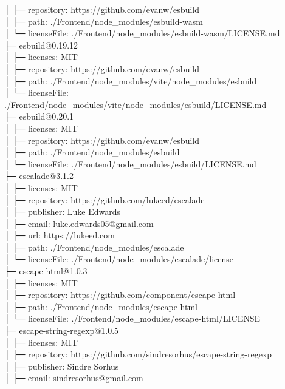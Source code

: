 │  ├─ repository: https://github.com/evanw/esbuild\\
│  ├─ path: ./Frontend/node\_modules/esbuild-wasm\\
│  └─ licenseFile: ./Frontend/node\_modules/esbuild-wasm/LICENSE.md\\
├─ esbuild@0.19.12\\
│  ├─ licenses: MIT\\
│  ├─ repository: https://github.com/evanw/esbuild\\
│  ├─ path: ./Frontend/node\_modules/vite/node\_modules/esbuild\\
│  └─ licenseFile: ./Frontend/node\_modules/vite/node\_modules/esbuild/LICENSE.md\\
├─ esbuild@0.20.1\\
│  ├─ licenses: MIT\\
│  ├─ repository: https://github.com/evanw/esbuild\\
│  ├─ path: ./Frontend/node\_modules/esbuild\\
│  └─ licenseFile: ./Frontend/node\_modules/esbuild/LICENSE.md\\
├─ escalade@3.1.2\\
│  ├─ licenses: MIT\\
│  ├─ repository: https://github.com/lukeed/escalade\\
│  ├─ publisher: Luke Edwards\\
│  ├─ email: luke.edwards05@gmail.com\\
│  ├─ url: https://lukeed.com\\
│  ├─ path: ./Frontend/node\_modules/escalade\\
│  └─ licenseFile: ./Frontend/node\_modules/escalade/license\\
├─ escape-html@1.0.3\\
│  ├─ licenses: MIT\\
│  ├─ repository: https://github.com/component/escape-html\\
│  ├─ path: ./Frontend/node\_modules/escape-html\\
│  └─ licenseFile: ./Frontend/node\_modules/escape-html/LICENSE\\
├─ escape-string-regexp@1.0.5\\
│  ├─ licenses: MIT\\
│  ├─ repository: https://github.com/sindresorhus/escape-string-regexp\\
│  ├─ publisher: Sindre Sorhus\\
│  ├─ email: sindresorhus@gmail.com\\
